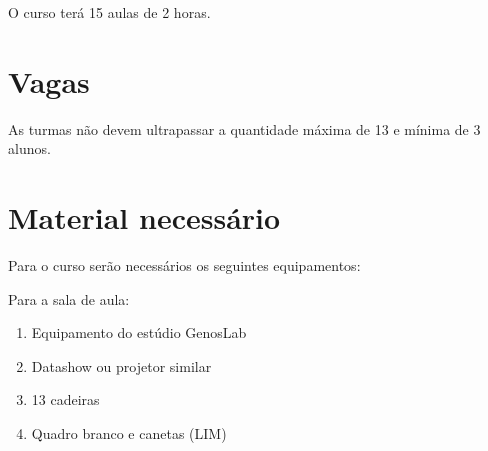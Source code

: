 \documentclass[12pt,brazil]{article}
\begin{document}
O curso terá 15 aulas de 2 horas.
 
\section{Vagas}
As turmas não devem ultrapassar a quantidade máxima de 13 e mínima de 3
alunos.

\section{Material necessário}
\label{sec:material}

Para o curso serão necessários os seguintes equipamentos:

Para a sala de aula:
\begin{enumerate}
\item Equipamento do estúdio GenosLab
\item Datashow ou projetor similar
\item 13 cadeiras
\item Quadro branco e canetas (LIM)
\end{enumerate}
\end{document}
